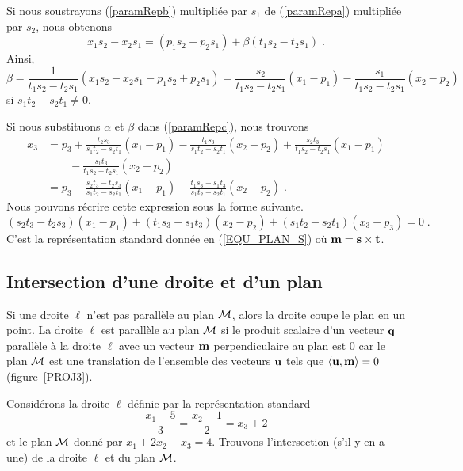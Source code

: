 {\begin{rmk}[\theory]
Si nous soustrayons (\ref{paramRepb}) multipliée par $s_1$ de (\ref{paramRepa})
multipliée par $s_2$, nous obtenons
\[
x_1 s_2 - x_2 s_1 = (p_1 s_2 - p_2 s_1) + \beta (t_1 s_2 - t_2 s_1) \; .
\]
Ainsi,
\[
\beta = \frac{1}{t_1 s_2 - t_2 s_1}
\left(x_1 s_2 - x_2 s_1 - p_1 s_2 + p_2 s_1\right) = 
\frac{s_2}{t_1 s_2 - t_2 s_1} \left(x_1 - p_1\right)
-\frac{s_1}{t_1 s_2 - t_2 s_1} \left(x_2 - p_2\right)
\]
si $s_1 t_2 - s_2 t_1 \neq 0$.

Si nous substituons $\alpha$ et $\beta$ dans (\ref{paramRepc}), nous
trouvons
\begin{align*}
x_3 &= p_3 +
\frac{t_2s_3}{s_1 t_2 - s_2 t_1} \left(x_1 - p_1\right)
-\frac{t_1 s_3}{s_1 t_2 - s_2 t_1} \left(x_2 - p_2\right)
+ \frac{s_2t_3}{t_1 s_2 - t_2 s_1} \left(x_1 - p_1\right) \\
& \qquad -\frac{s_1t_3}{t_1 s_2 - t_2 s_1} \left(x_2 - p_2\right) \\
&= p_3 - \frac{s_2 t_3 - t_2s_3}{s_1 t_2 - s_2 t_1} \left(x_1 -p_1\right)
- \frac{t_1 s_3 - s_1 t_3}{s_1 t_2 - s_2 t_1} \left(x_2 - p_2\right) \; .
\end{align*}
Nous pouvons récrire cette expression sous la forme suivante.
\[
\left(s_2 t_3 - t_2s_3\right) \left(x_1 -p_1\right) 
+ \left(t_1 s_3 - s_1 t_3\right) \left(x_2 - p_2\right)
+ \left(s_1 t_2 - s_2 t_1\right) \left(x_3 - p_3\right) = 0 \; .
\]
C'est la représentation standard donnée en (\ref{EQU_PLAN_S}) où
$\mathbf{m} = \mathbf{s} \times \mathbf{t}$.
\end{rmk}

\subsection{Intersection d'une droite et d'un plan}

Si une droite $\ell$ n'est pas parallèle au plan $\cal M$, alors la
droite coupe le plan en un point.  La droite $\ell$ est parallèle au
plan $\cal M$ si le produit scalaire d'un vecteur $\mathbf{q}$ parallèle
à la droite $\ell$ avec un vecteur $\mathbf{m}$ perpendiculaire au plan
est $0$ car le plan $\cal M$ est une translation de l'ensemble des
vecteurs $\mathbf{u}$ tels que $\left\langle{\mathbf{u}} , {\mathbf{m}}\right\rangle = 0$ (figure~\ref{PROJ3}).


\begin{egg}
Considérons la droite $\ell$ définie par la représentation standard
\[
\frac{x_1-5}{3} = \frac{x_2-1}{2} = x_3+2
\]
et le plan $\cal M$ donné par $x_1+2x_2+x_3 = 4$.  Trouvons l'intersection
(s'il y en a une) de la droite $\ell$ et du plan $\cal M$.
  

\end{egg}}
